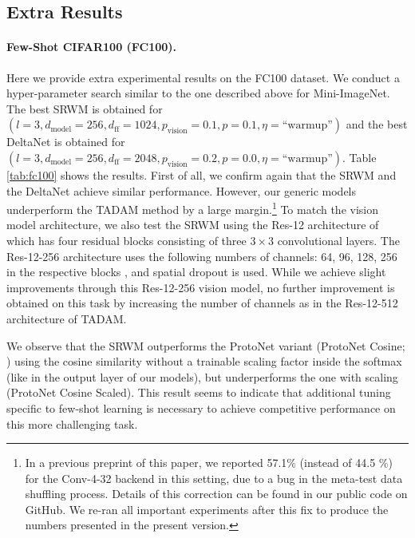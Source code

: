 \documentclass[nohyperref]{article}
\theoremstyle{plain}
\theoremstyle{definition}
\theoremstyle{remark}
\begin{document}
\subsection{Extra Results}
\label{app:extra_fsl_exp}
\paragraph{Few-Shot CIFAR100 (FC100).}
Here we provide extra experimental results on the FC100 dataset.
We conduct a hyper-parameter search similar to the one described above for Mini-ImageNet.
The best SRWM is obtained for $(l=3, d_\text{model}=256, d_\text{ff}=1024, p_\text{vision}=0.1, p=0.1, \eta=\text{``warmup''})$ and the best DeltaNet is obtained for $(l=3, d_\text{model}=256, d_\text{ff}=2048, p_\text{vision}=0.2, p=0.0, \eta=\text{``warmup''})$.
Table \ref{tab:fc100} shows the results.
First of all, we confirm again that the SRWM and the DeltaNet achieve similar performance.
However, our generic models underperform the TADAM \citep{OreshkinLL18} method by a large margin.\footnote{In a previous preprint of this paper, we reported 57.1\% (instead of 44.5 \%) for the Conv-4-32 backend in this setting,
due to a bug in the meta-test data shuffling process.
Details of this correction can be found in our public code on GitHub.
We re-ran all important experiments after this fix to produce the numbers presented in the present version.}
To match the vision model architecture,
we also test the SRWM using the Res-12 architecture of \citet{chen2021meta} which has four residual blocks consisting of three $3 \times 3$ convolutional layers.
The Res-12-256 architecture uses the following numbers of channels: 64, 96, 128, 256 in the respective blocks \citep{mishra2018a}, and spatial dropout \citep{TompsonGJLB15} is used.
While we achieve slight improvements through this Res-12-256 vision model, no further improvement is obtained on this task by increasing the number of channels as in the Res-12-512 architecture of TADAM.

We observe that the SRWM outperforms the ProtoNet variant (ProtoNet Cosine; \citet{OreshkinLL18}) using the cosine similarity without a trainable scaling factor inside the softmax (like in the output layer of our models), but underperforms the one with scaling (ProtoNet Cosine Scaled).
This result seems to indicate that
additional tuning specific to few-shot learning is necessary to achieve competitive performance on this more challenging task.
\end{document}
